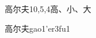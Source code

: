 \begin{entry}{高尔夫}{10,5,4}{⾼、⼩、⼤}
  \begin{phonetics}{高尔夫}{gao1'er3fu1}
  \end{phonetics}
\end{entry}
